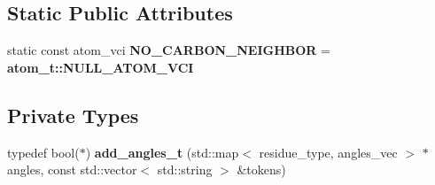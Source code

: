 \subsection*{Static Public Attributes}
\begin{CompactItemize}
\item 
static const atom\_\-vci \textbf{NO\_\-CARBON\_\-NEIGHBOR} = \bf{atom\_\-t::NULL\_\-ATOM\_\-VCI}\label{classASCbase_1_1HbondPoints_ada240a8c1e41ce847e1a4d02d08eba8}

\end{CompactItemize}
\subsection*{Private Types}
\begin{CompactItemize}
\item 
typedef bool($\ast$) \textbf{add\_\-angles\_\-t} (std::map$<$ residue\_\-type, angles\_\-vec $>$ $\ast$angles, const std::vector$<$ std::string $>$ \&tokens)\label{classASCbase_1_1HbondPoints_7fcd7708b6fd8bdae05d31921b01749d}

\end{CompactItemize}
